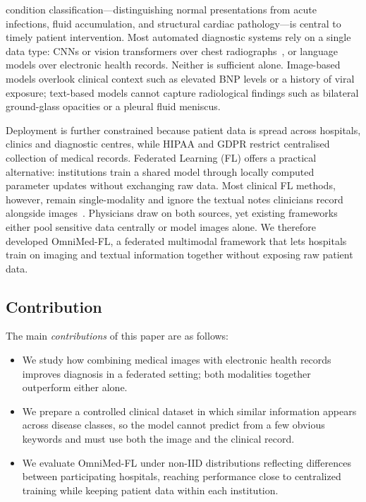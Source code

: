 \documentclass[letterpaper, conference]{IEEEtran}
\begin{document}
 condition classification---distinguishing normal
presentations from acute infections, fluid accumulation, and structural cardiac
pathology---is central to timely patient intervention. Most automated diagnostic
systems rely on a single data type: CNNs or vision transformers over chest
radiographs~\cite{Rajpurkar2017,Irvin2019}, or language models over electronic
health records. Neither is sufficient alone. Image-based models overlook clinical
context such as elevated BNP levels or a history of viral exposure; text-based
models cannot capture radiological findings such as bilateral ground-glass
opacities or a pleural fluid meniscus.

Deployment is further constrained because patient data is spread across
hospitals, clinics and diagnostic centres, while HIPAA and GDPR restrict
centralised collection of medical records. Federated Learning (FL) offers a
practical alternative: institutions train a shared model through locally computed
parameter updates without exchanging raw data. Most clinical FL methods, however,
remain single-modality and ignore the textual notes clinicians record alongside
images~\cite{Sheller2020,Dou2021,Kaissis2021}. Physicians draw on both sources,
yet existing frameworks either pool sensitive data centrally or model images
alone. We therefore developed OmniMed-FL, a federated multimodal framework that
lets hospitals train on imaging and textual information together without exposing
raw patient data.

\subsection{Contribution}
The main \textit{contributions} of this paper are as follows:
\begin{itemize}
\item We study how combining medical images with electronic health records
improves diagnosis in a federated setting; both modalities together outperform
either alone.

\item We prepare a controlled clinical dataset in which similar information
appears across disease classes, so the model cannot predict from a few obvious
keywords and must use both the image and the clinical record.

\item We evaluate OmniMed-FL under non-IID distributions reflecting differences
between participating hospitals, reaching performance close to centralized
training while keeping patient data within each institution.
\end{itemize}
\end{document}
